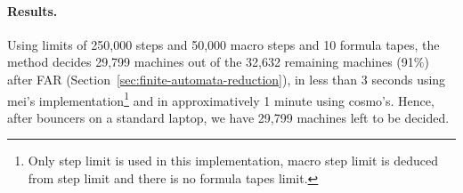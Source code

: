 \paragraph*{Results.} Using limits of 250,000 steps and 50,000 macro steps and 10 formula tapes, the method decides 29,799 machines out of the 32,632 remaining machines (91\%) after FAR (Section~\ref{sec:finite-automata-reduction}), in less than 3 seconds using mei's implementation\footnote{Only step limit is used in this implementation, macro step limit is deduced from step limit and there is no formula tapes limit.} and in approximatively 1 minute using cosmo's. Hence, after bouncers on a standard laptop, we have 29,799 machines left to be decided.